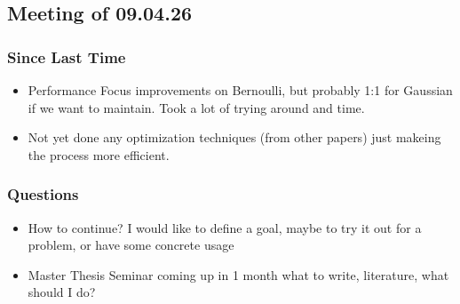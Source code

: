 \subsection{Meeting of 09.04.26}
\subsubsection{Since Last Time}
\begin{itemize}
    \item Performance Focus improvements on Bernoulli, but probably 1:1 for Gaussian if we want to maintain. Took a lot of trying around and time.
    \item Not yet done any optimization techniques (from other papers) just makeing the process more efficient.
\end{itemize}
\subsubsection{Questions}
\begin{itemize}
    \item How to continue? I would like to define a goal, maybe to try it out for a problem, or have some concrete usage
    \item Master Thesis Seminar coming up in 1 month what to write, literature, what should I do?
\end{itemize}
